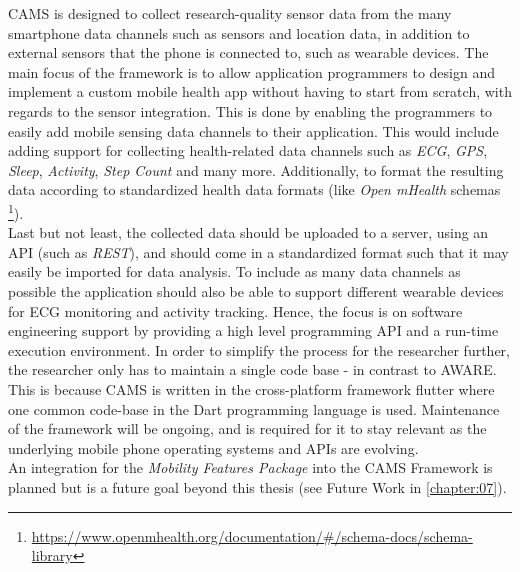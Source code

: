 CAMS is designed to collect research-quality sensor data from the many smartphone data channels such as sensors and location data, in addition to external sensors that the phone is connected to, such as wearable devices. The main focus of the framework is to allow application programmers to design and implement a custom mobile health app without having to start from scratch, with regards to the sensor integration. This is done by enabling the programmers to easily add mobile sensing data channels to their application. This would include adding support for collecting health-related data channels such as \textit{ECG}, \textit{GPS}, \textit{Sleep}, \textit{Activity}, \textit{Step Count} and many more. Additionally, to format the resulting data according to standardized health data formats (like \textit{Open mHealth} schemas \footnote{\url{https://www.openmhealth.org/documentation/#/schema-docs/schema-library}}). \\

Last but not least, the collected data should be uploaded to a server, using an API (such as \textit{REST}), and should come in a standardized format such that it may easily be imported for data analysis. To include as many data channels as possible the application should also be able to support different wearable devices for ECG monitoring and activity tracking. Hence, the focus is on software engineering support by providing a high level programming API and a run-time execution environment. In order to simplify the process for the researcher further, the researcher only has to maintain a single code base - in contrast to AWARE. This is because CAMS  is written in the cross-platform framework flutter where one common code-base in the Dart programming language is used. Maintenance of the framework will be ongoing, and is required for it to stay relevant as the underlying mobile phone operating systems and APIs are evolving. \\

An integration for the \textit{Mobility Features Package} into the CAMS Framework is planned but is a future goal beyond this thesis (see Future Work in \ref{chapter:07}).